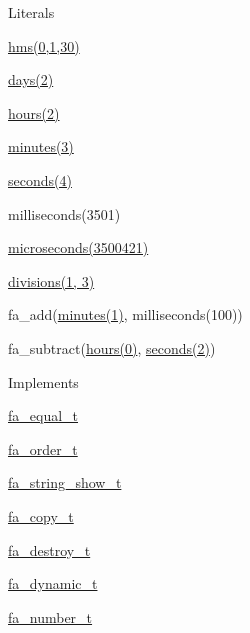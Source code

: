 \begin{DoxyParagraph}{Literals}

\begin{DoxyItemize}
\item {\ttfamily \hyperlink{util_8h_a7e8aef59b2725d985f4fdfeb7bbe76c7}{hms(0,1,30)}}
\item {\ttfamily \hyperlink{util_8h_a300f263b1eae073cc0df9c2450f9b3de}{days(2)}}
\item {\ttfamily \hyperlink{util_8h_a2538097ff7138a83801cced657c8cfbf}{hours(2)}}
\item {\ttfamily \hyperlink{util_8h_a237a482b0d534168d425b103ab35cf61}{minutes(3)}}
\item {\ttfamily \hyperlink{util_8h_a1a3cd4cff330c981ed89bbd3a3426273}{seconds(4)}}
\item {\ttfamily milliseconds(3501)}
\item {\ttfamily \hyperlink{util_8h_a4d5c56472e8b46114ed4f93e3715aea1}{microseconds(3500421)}}
\item {\ttfamily \hyperlink{util_8h_a91bb660ad7b1ca43a90fbf23a97a0911}{divisions(1, 3)}}
\item {\ttfamily fa\-\_\-add(\hyperlink{util_8h_a237a482b0d534168d425b103ab35cf61}{minutes(1)}, milliseconds(100))}
\item {\ttfamily fa\-\_\-subtract(\hyperlink{util_8h_a2538097ff7138a83801cced657c8cfbf}{hours(0)}, \hyperlink{util_8h_a1a3cd4cff330c981ed89bbd3a3426273}{seconds(2)})}
\end{DoxyItemize}
\end{DoxyParagraph}
\begin{DoxyParagraph}{Implements}

\begin{DoxyItemize}
\item \hyperlink{structfa__equal__t}{fa\-\_\-equal\-\_\-t}
\item \hyperlink{structfa__order__t}{fa\-\_\-order\-\_\-t}
\item \hyperlink{structfa__string__show__t}{fa\-\_\-string\-\_\-show\-\_\-t}
\item \hyperlink{structfa__copy__t}{fa\-\_\-copy\-\_\-t}
\item \hyperlink{structfa__destroy__t}{fa\-\_\-destroy\-\_\-t}
\item \hyperlink{structfa__dynamic__t}{fa\-\_\-dynamic\-\_\-t}
\item \hyperlink{structfa__number__t}{fa\-\_\-number\-\_\-t} 
\end{DoxyItemize}
\end{DoxyParagraph}


